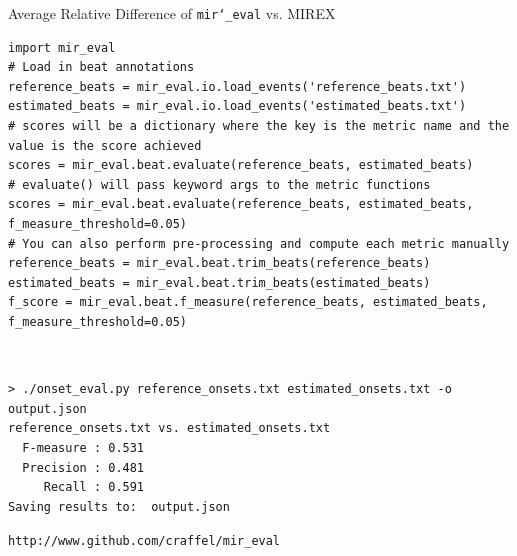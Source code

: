 \documentclass[paperwidth=120cm,paperheight=150cm,portrait,fontscale=.22,margin=5cm,lmargin=.2cm,rmargin=.2cm]{baposter}
\def\mireval{\texttt{mir\char`_eval}}
\begin{document}
\begin{poster}
\begin{posterbox}[column=0,below=auto,span=2]{Average Relative Difference of \mireval{} vs. MIREX}
\end{posterbox}

\begin{posterbox}[column=0,below=auto,span=2,boxColorOne=white]{}

\begin{verbatim}
import mir_eval
# Load in beat annotations
reference_beats = mir_eval.io.load_events('reference_beats.txt')
estimated_beats = mir_eval.io.load_events('estimated_beats.txt')
# scores will be a dictionary where the key is the metric name and the value is the score achieved
scores = mir_eval.beat.evaluate(reference_beats, estimated_beats)
# evaluate() will pass keyword args to the metric functions
scores = mir_eval.beat.evaluate(reference_beats, estimated_beats, f_measure_threshold=0.05)
# You can also perform pre-processing and compute each metric manually
reference_beats = mir_eval.beat.trim_beats(reference_beats)
estimated_beats = mir_eval.beat.trim_beats(estimated_beats)
f_score = mir_eval.beat.f_measure(reference_beats, estimated_beats, f_measure_threshold=0.05)
\end{verbatim}

$\;$\\[-1em]

\begin{verbatim}
> ./onset_eval.py reference_onsets.txt estimated_onsets.txt -o output.json
reference_onsets.txt vs. estimated_onsets.txt
  F-measure : 0.531
  Precision : 0.481
     Recall : 0.591
Saving results to:  output.json
\end{verbatim}


\centering\huge
\texttt{http://www.github.com/craffel/mir\_eval}

\end{posterbox}

\end{poster}
\end{document}

